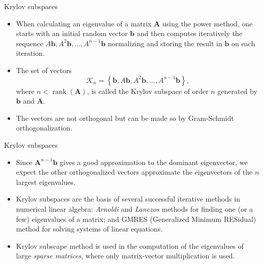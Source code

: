 \documentclass{beamer}
\begin{document}
\begin{frame}{Krylov subspaces}
    \begin{itemize}
        \item When calculating an eigenvalue of a matrix $\mathbf{A}$ using the power method, one starts with an initial random
        vector $\mathbf{b}$ and then computes iteratively the sequence $A \mathbf{b}, A^2 \mathbf{b}, \ldots, A^{n-1} \mathbf{b}$ normalizing and storing the
        result in $\mathbf{b}$ on each iteration.
        \item The set of vectors
        $$
            \mathcal{K}_n=\left\{\mathbf{b}, A \mathbf{b}, A^2 \mathbf{b}, \ldots, A^{n-1} \mathbf{b}\right\},
        $$
        where $n< \operatorname{rank}(\mathbf{A})$, is called the Krylov subspace of order $n$ generated by $\mathbf{b}$ and $\mathbf{A}$.
        \item The vectors are not orthogonal but can be made so  by Gram-Schmidt orthogonalization.
    \end{itemize}
\end{frame}
\begin{frame}{Krylov subspaces}
    \begin{itemize}
        \item Since $\mathbf{A}^{n-1}\mathbf{b}$ gives a good approximation to the dominant eigenvector, we expect the other orthogonalized vectors approximate the eigenvectors of the $n$ largest eigenvalues.

        \item Krylov subspaces are the basis of several successful iterative methods in numerical linear algebra: \emph{Arnoldi} and \emph{Lanczos} methods for finding one (or a few) eigenvalues of a matrix; and {GMRES}
        (Generalized Minimum RESidual) method for solving systems of linear equations.
        \item Krylov subscape method is used in the computation of the eigenvalues of large \emph{sparse matrices}, where only matrix-vector multiplication is used. 
    \end{itemize}
\end{frame}
\end{document}
